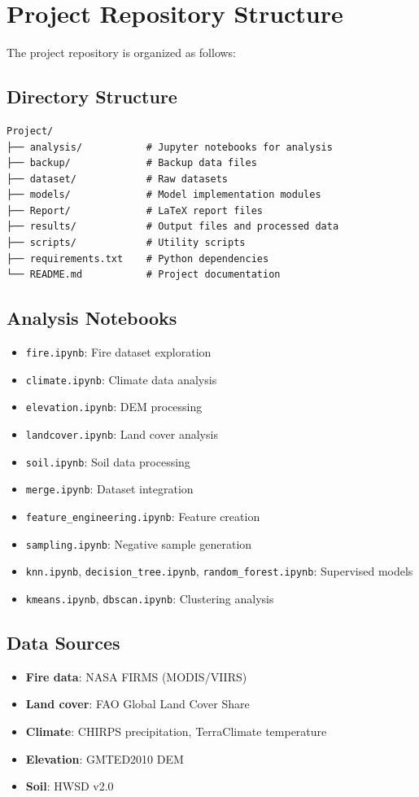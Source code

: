 \appendix

\chapter{Project Repository Structure}
\label{app:project}

The project repository is organized as follows:

\section*{Directory Structure}
\begin{verbatim}
Project/
├── analysis/           # Jupyter notebooks for analysis
├── backup/             # Backup data files
├── dataset/            # Raw datasets
├── models/             # Model implementation modules
├── Report/             # LaTeX report files
├── results/            # Output files and processed data
├── scripts/            # Utility scripts
├── requirements.txt    # Python dependencies
└── README.md           # Project documentation
\end{verbatim}

\section*{Analysis Notebooks}
\begin{itemize}
    \item \texttt{fire.ipynb}: Fire dataset exploration
    \item \texttt{climate.ipynb}: Climate data analysis
    \item \texttt{elevation.ipynb}: DEM processing
    \item \texttt{landcover.ipynb}: Land cover analysis
    \item \texttt{soil.ipynb}: Soil data processing
    \item \texttt{merge.ipynb}: Dataset integration
    \item \texttt{feature\_engineering.ipynb}: Feature creation
    \item \texttt{sampling.ipynb}: Negative sample generation
    \item \texttt{knn.ipynb}, \texttt{decision\_tree.ipynb}, \texttt{random\_forest.ipynb}: Supervised models
    \item \texttt{kmeans.ipynb}, \texttt{dbscan.ipynb}: Clustering analysis
\end{itemize}

\section*{Data Sources}
\begin{itemize}
    \item \textbf{Fire data}: NASA FIRMS (MODIS/VIIRS)
    \item \textbf{Land cover}: FAO Global Land Cover Share
    \item \textbf{Climate}: CHIRPS precipitation, TerraClimate temperature
    \item \textbf{Elevation}: GMTED2010 DEM
    \item \textbf{Soil}: HWSD v2.0
\end{itemize}

